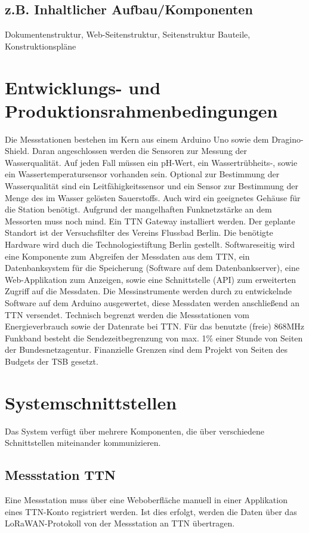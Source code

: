 \documentclass[
11pt,
a4paper,
ngerman,
]{article}
\newcommand{\descriptionWhat}[1]{%
	\begin{itshape}%
	#1 \\%
	\end{itshape}%
}
\begin{document}
\subsection{z.B. Inhaltlicher Aufbau/Komponenten}

\descriptionWhat{Dokumentenstruktur, Web-Seitenstruktur, Seitenstruktur Bauteile, Konstruktionspläne}

\newpage

\section{Entwicklungs- und Produktionsrahmenbedingungen}

Die Messstationen bestehen im Kern aus einem Arduino Uno sowie dem Dragino-Shield. Daran angeschlossen werden die Sensoren zur Messung der Wasserqualität. Auf jeden Fall müssen ein pH-Wert, ein Wassertrübheits-, sowie ein Wassertemperatursensor vorhanden sein. Optional zur Bestimmung der Wasserqualität sind ein Leitfähigkeitssensor und ein Sensor zur Bestimmung der Menge des im Wasser gelösten Sauerstoffs. Auch wird ein geeignetes Gehäuse für die Station benötigt.
Aufgrund der mangelhaften Funknetzstärke an dem Messorten muss noch mind. Ein TTN Gateway installiert werden. Der geplante Standort ist der Versuchsfilter des Vereins Flussbad Berlin. Die benötigte Hardware wird duch die Technologiestiftung Berlin gestellt.
Softwareseitig wird eine Komponente zum Abgreifen der Messdaten aus dem TTN, ein Datenbanksystem für die Speicherung (Software auf dem Datenbankserver), eine Web-Applikation zum Anzeigen, sowie eine Schnittstelle (API) zum erweiterten Zugriff auf die Messdaten. Die Messinstrumente werden durch zu entwickelnde Software auf dem Arduino ausgewertet, diese Messdaten werden anschließend an TTN versendet.
Technisch begrenzt werden die Messstationen vom Energieverbrauch sowie der Datenrate bei TTN. Für das benutzte (freie) 868MHz Funkband besteht die Sendezeitbegrenzung von max. 1\% einer Stunde von Seiten der Bundesnetzagentur.
Finanzielle Grenzen sind dem Projekt von Seiten des Budgets der TSB gesetzt.

\section{Systemschnittstellen}

Das System verf\"ugt \"uber mehrere Komponenten, die \"uber verschiedene
Schnittstellen miteinander kommunizieren.

\subsection{Messstation \rightarrow TTN}
Eine Messstation muss \"uber eine Weboberfl\"ache manuell in einer Applikation
eines TTN-Konto registriert werden. Ist dies erfolgt, werden die Daten \"uber
das LoRaWAN-Protokoll von der Messstation an TTN \"ubertragen.
\end{document}
